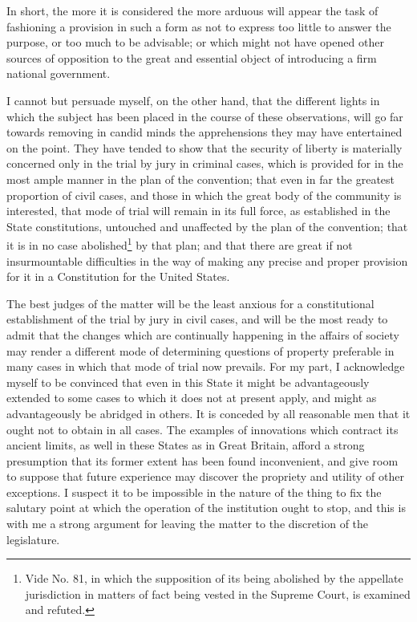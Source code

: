 In short, the more it is considered the more arduous will appear the task of fashioning a provision in such a form as not to express too little to answer the purpose, or too much to be advisable; or which might not have opened other sources of opposition to the great and essential object of introducing a firm national government.

I cannot but persuade myself, on the other hand, that the different lights in which the subject has been placed in the course of these observations, will go far towards removing in candid minds the apprehensions they may have entertained on the point. They have tended to show that the security of liberty is materially concerned only in the trial by jury in criminal cases, which is provided for in the most ample manner in the plan of the convention; that even in far the greatest proportion of civil cases, and those in which the great body of the community is interested, that mode of trial will remain in its full force, as established in the State constitutions, untouched and unaffected by the plan of the convention; that it is in no case abolished\footnote{Vide No. 81, in which the supposition of its being abolished by the appellate jurisdiction in matters of fact being vested in the Supreme Court, is examined and refuted.} by that plan; and that there are great if not insurmountable difficulties in the way of making any precise and proper provision for it in a Constitution for the United States.

The best judges of the matter will be the least anxious for a constitutional establishment of the trial by jury in civil cases, and will be the most ready to admit that the changes which are continually happening in the affairs of society may render a different mode of determining questions of property preferable in many cases in which that mode of trial now prevails. For my part, I acknowledge myself to be convinced that even in this State it might be advantageously extended to some cases to which it does not at present apply, and might as advantageously be abridged in others. It is conceded by all reasonable men that it ought not to obtain in all cases. The examples of innovations which contract its ancient limits, as well in these States as in Great Britain, afford a strong presumption that its former extent has been found inconvenient, and give room to suppose that future experience may discover the propriety and utility of other exceptions. I suspect it to be impossible in the nature of the thing to fix the salutary point at which the operation of the institution ought to stop, and this is with me a strong argument for leaving the matter to the discretion of the legislature.

